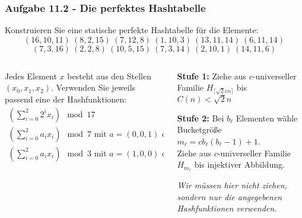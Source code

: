\documentclass{beamer}
\begin{document}
\begin{frame}
	\frametitle{Aufgabe 11.2 - Die perfektes Hashtabelle}
	\small
	Konstruieren Sie eine statische perfekte Hashtabelle für die Elemente:
	$$(16, 10, 11) \  (8, 2, 15) \ (7, 12, 8) \  (1, 10, 3) \ (13, 11, 14) \ (6, 11, 14)$$
	$$(7, 3, 16) \  (2, 2, 8) \  (10, 5, 15)  \ (7, 3, 14)  \ (2, 10, 1)  \ (14, 11, 6)$$

	\begin{columns}
		\begin{column}{0.48\textwidth}
			Jedes Element $x$ besteht aus den Stellen $(x_0, x_1, x_2)$. Verwenden Sie jeweils passend eine der Hashfunktionen:
			\tiny
			\begin{gather*}
				\left( \sum_{i=0}^{2} 2^i x_i \right) \mod 17 \\
				\left( \sum_{i=0}^{2} a_i x_i \right) \mod 7 \text{ mit } a = (0, 0, 1) \text{ oder } a = (6, 6, 2) \\
				\left( \sum_{i=0}^{2} a_i x_i \right) \mod 3 \text{ mit } a = (1, 0, 0) \text{ oder } a = (0, 2, 2)
			\end{gather*}
		\end{column}
		\begin{column}{0.48\textwidth}
			\textbf{Stufe 1:} Ziehe aus $c$-universeller Familie $H_{\lceil \sqrt{2}cn \rceil}$ bis $C(n) < \sqrt{2}n$

			\medskip
			\textbf{Stufe 2:} Bei $b_\ell$ Elementen wähle Bucketgröße $m_\ell = cb_\ell(b_\ell - 1) + 1$. \\
			Ziehe aus $c$-universeller Familie $H_{m_\ell}$ bis injektiver Abbildung.

			\medskip
			\scriptsize
			\textit{Wir müssen hier nicht ziehen, sondern nur die angegebenen Hashfunktionen verwenden.}
		\end{column}
	\end{columns}
\end{frame}
\end{document}
